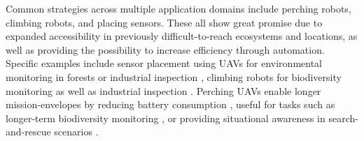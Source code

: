 



Common strategies across multiple application domains include perching robots, climbing robots, and placing sensors. These all show great promise due to expanded accessibility in previously difficult-to-reach ecosystems and locations, as well as providing the possibility to increase efficiency through automation. Specific examples include sensor placement using UAVs for environmental monitoring in forests or industrial inspection \cite{Hamaza, Hamaza2020, Geckeler2022a, Jarvis2018}, climbing robots for biodiversity monitoring \cite{Lam2012} as well as industrial inspection \cite{Hong2022}. Perching UAVs enable longer mission-envelopes by reducing battery consumption \cite{Li2022, Graule2016, Zhang2017a, Hsiao2023}, useful for tasks such as longer-term biodiversity monitoring \cite{Kirchgeorg2023a, Nguyen2019, Roderick2021}, or providing situational awareness in search-and-rescue scenarios \cite{Delmerico2019}.


